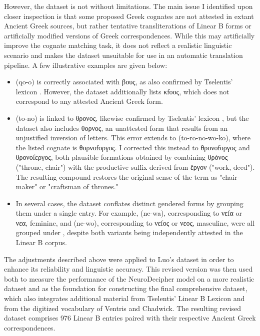 However, the dataset is not without limitations.
The main issue I identified upon closer inspection is that some proposed Greek cognates are not attested in extant Ancient Greek sources, but rather tentative transliterations of Linear B forms or artificially modified versions of Greek correspondences.
While this may artificially improve the cognate matching task, it does not reflect a realistic linguistic scenario and makes the dataset unsuitable for use in an automatic translation pipeline.
A few illustrative examples are given below:

\begin{itemize}
\item \textlinb{\Bqo\Bo} (qo-o) is correctly associated with \textgreek{βους}, as also confirmed by Tselentis' lexicon \cite{tselentis}. However, the dataset additionally lists \textgreek{κfοος}, which does not correspond to any attested Ancient Greek form.
\item \textlinb{\Bto\Bo} (to-no) is linked to \textgreek{θρονος}, likewise confirmed by Tselentis' lexicon \cite{tselentis}, but the dataset also includes \textgreek{θορνος}, an unattested form that results from an unjustified inversion of letters.
This error extends to \textlinb{\Bto\Bro\Bno\Bwo\Bko} (to-ro-no-wo-ko), where the listed cognate is \textgreek{θορνοfοργος}. I corrected this instead to \textgreek{θρονοfοργος} and \textgreek{θρονοfεργος}, both plausible formations obtained by combining \textgreek{θρόνος} ("throne, chair") with the productive suffix derived from \textgreek{ἔργον} ("work, deed"). The resulting compound restores the original sense of the term as "chair-maker" or "craftsman of thrones."
\item In several cases, the dataset conflates distinct gendered forms by grouping them under a single entry. For example, \textlinb{\Bne\Bwa} (ne-wa), corresponding to \textgreek{νεfα} or \textgreek{νεα}, feminine, and \textlinb{\Bne\Bwo} (ne-wo), corresponding to \textgreek{νεfος} or \textgreek{νεος}, masculine, were all grouped under \textlinb{\Bne\Bwa}, despite both variants being independently attested in the Linear B corpus.
\end{itemize}

The adjustments described above were applied to Luo's dataset in order to enhance its reliability and linguistic accuracy.
This revised version was then used both to measure the performance of the NeuroDecipher model on a more realistic dataset and as the foundation for constructing the final comprehensive dataset, which also integrates additional material from Tselentis' Linear B Lexicon and from the digitized vocabulary of Ventris and Chadwick.
The resulting revised dataset comprises 976 Linear B entries paired with their respective Ancient Greek correspondences.

